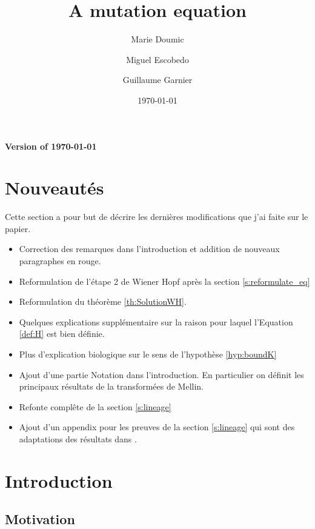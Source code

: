 \documentclass[11pt]{amsart}
\title{A mutation equation}
\author{Marie Doumic \and Miguel Escobedo \and Guillaume Garnier}
\date{\today}
\begin{document}
\maketitle
\begin{center}
    \textbf{Version of \today}
\end{center}

\tableofcontents

\section*{Nouveautés}
Cette section a pour but de décrire les dernières modifications que j'ai faite sur le papier.

\begin{itemize}
    \item Correction des remarques dans l'introduction et addition de nouveaux paragraphes en rouge. 
    \item Reformulation de l'étape 2 de Wiener Hopf après la section \ref{s:reformulate_eq} 
    \item Reformulation du théorème \ref{th:SolutionWH}. 
    \item Quelques explications supplémentaire sur la raison pour laquel l'Equation \ref{def:H} est bien définie. 
    \item Plus d'explication biologique sur le sens de l'hypothèse \ref{hyp:boundK}
    \item Ajout d'une partie Notation dans l'introduction. En particulier on définit les principaux résultats de la transformées de Mellin. 
    \item Refonte complête de la section \ref{s:lineage}
    \item Ajout d'un appendix pour les preuves de la section \ref{s:lineage} qui sont des adaptations des résultats dans \cite{doumic2016time}.
\end{itemize}

\section{Introduction}

\subsection{Motivation} \mbox{}
\end{document}
